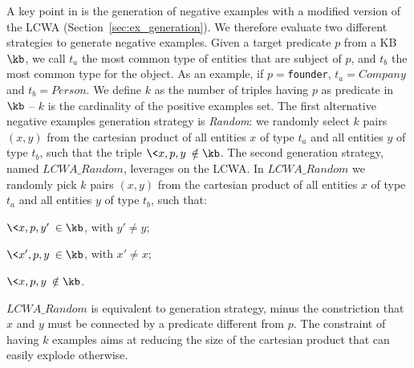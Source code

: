 A key point in \krd is the generation of negative examples with a modified version of the LCWA (Section~\ref{sec:ex_generation}). We therefore evaluate two different strategies to generate negative examples. Given a target predicate $p$ from a KB $\kb$, we call $t_a$ the most common type of entities that are subject of $p$, and $t_b$ the most common type for the object. As an example, if $p=$\texttt{founder}, $t_a=Company$ and $t_b=Person$. We define $k$ as the number of triples having $p$ as predicate in $\kb$ -- $k$ is the cardinality of the positive examples set. The first alternative negative examples generation strategy is \emph{Random}: we randomly select $k$ pairs $(x,y)$ from the cartesian product of all entities $x$ of type $t_a$ and all entities $y$ of type $t_b$, such that the triple $\<x,p,y\> \notin \kb$. The second generation strategy, named ${LCWA}\_Random$, leverages on the LCWA. In $LCWA\_Random$ we randomly pick $k$ pairs $(x,y)$ from the cartesian product of all entities $x$ of type $t_a$ and all entities $y$ of type $t_b$, such that:
\begin{inparaenum}[\itshape(i)]
	\item $\<x,p,y'\> \in \kb$, with $y' \neq y$;
	\item $\<x',p,y\> \in \kb$, with $x' \neq x$;
	\item $\<x,p,y\> \notin \kb$.
\end{inparaenum}
$LCWA\_Random$ is equivalent to \krd generation strategy, minus the constriction that $x$ and $y$ must be connected by a predicate different from $p$. The constraint of having $k$ examples aims at reducing the size of the cartesian product that can easily explode otherwise.

